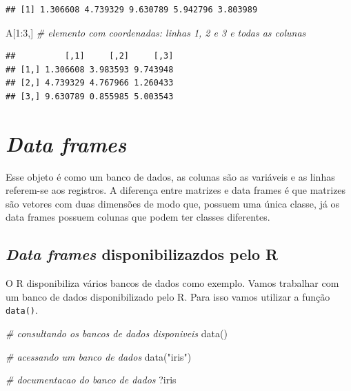 \documentclass[
]{book}
\newenvironment{Shaded}{\begin{snugshade}}{\end{snugshade}}
\newcommand{\CommentTok}[1]{\textcolor[rgb]{0.56,0.35,0.01}{\textit{#1}}}
\newcommand{\DecValTok}[1]{\textcolor[rgb]{0.00,0.00,0.81}{#1}}
\newcommand{\FunctionTok}[1]{\textcolor[rgb]{0.00,0.00,0.00}{#1}}
\newcommand{\NormalTok}[1]{#1}
\newcommand{\SpecialCharTok}[1]{\textcolor[rgb]{0.00,0.00,0.00}{#1}}
\newcommand{\StringTok}[1]{\textcolor[rgb]{0.31,0.60,0.02}{#1}}
\begin{document}
\begin{verbatim}
## [1] 1.306608 4.739329 9.630789 5.942796 3.803989
\end{verbatim}

\begin{Shaded}
\begin{Highlighting}[]
\NormalTok{A[}\DecValTok{1}\SpecialCharTok{:}\DecValTok{3}\NormalTok{,] }\CommentTok{\# elemento com coordenadas: linhas 1, 2 e 3 e todas as colunas}
\end{Highlighting}
\end{Shaded}

\begin{verbatim}
##          [,1]     [,2]     [,3]
## [1,] 1.306608 3.983593 9.743948
## [2,] 4.739329 4.767966 1.260433
## [3,] 9.630789 0.855985 5.003543
\end{verbatim}

\hypertarget{data-frames}{%
\section{\texorpdfstring{\emph{Data frames}}{Data frames}}\label{data-frames}}

Esse objeto é como um banco de dados, as colunas são as variáveis e as linhas referem-se aos registros. A diferença entre matrizes e data frames é que matrizes são vetores com duas dimensões de modo que, possuem uma única classe, já os data frames possuem colunas que podem ter classes diferentes.

\hypertarget{data-frames-disponibilizazdos-pelo-r}{%
\subsection{\texorpdfstring{\emph{Data frames} disponibilizazdos pelo R}{Data frames disponibilizazdos pelo R}}\label{data-frames-disponibilizazdos-pelo-r}}

O R disponibiliza vários bancos de dados como exemplo. Vamos trabalhar com um banco de dados disponibilizado pelo R. Para isso vamos utilizar a função \texttt{data()}.

\begin{Shaded}
\begin{Highlighting}[]
\CommentTok{\# consultando os bancos de dados disponiveis}
\FunctionTok{data}\NormalTok{()}

\CommentTok{\# acessando um banco de dados}
\FunctionTok{data}\NormalTok{(}\StringTok{"iris"}\NormalTok{)}

\CommentTok{\# documentacao do banco de dados}
\NormalTok{?iris}
\end{Highlighting}
\end{Shaded}
\end{document}
